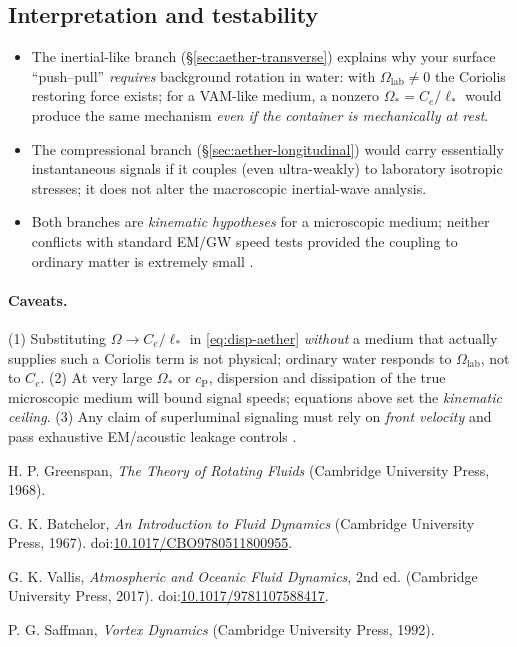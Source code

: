 \documentclass[12pt]{article}
\begin{document}
\subsection{Interpretation and testability}
\begin{itemize}
\item The inertial-like branch (\S\ref{sec:aether-transverse}) explains why your surface ``push--pull'' \emph{requires} background rotation in water: with $\Omega_{\text{lab}}\neq 0$ the Coriolis restoring force exists; for a VAM-like medium, a nonzero $\Omega_*=C_e/\ell_*$ would produce the same mechanism \emph{even if the container is mechanically at rest}.
\item The compressional branch (\S\ref{sec:aether-longitudinal}) would carry essentially instantaneous signals if it couples (even ultra-weakly) to laboratory isotropic stresses; it does not alter the macroscopic inertial-wave analysis.
\item Both branches are \emph{kinematic hypotheses} for a microscopic medium; neither conflicts with standard EM/GW speed tests provided the coupling to ordinary matter is extremely small \cite{Abbott2017PRL,Abbott2017ApJL}.
\end{itemize}

\paragraph{Caveats.}
(1) Substituting $\Omega\to C_e/\ell_*$ in \eqref{eq:disp-aether} \emph{without} a medium that actually supplies such a Coriolis term is not physical; ordinary water responds to $\Omega_{\text{lab}}$, not to $C_e$. (2) At very large $\Omega_*$ or $c_{\mathrm{P}}$, dispersion and dissipation of the true microscopic medium will bound signal speeds; equations above set the \emph{kinematic ceiling}. (3) Any claim of superluminal signaling must rely on \emph{front velocity} and pass exhaustive EM/acoustic leakage controls \cite{Brillouin1960}.



\begin{thebibliography}{9}

H. P. Greenspan, \emph{The Theory of Rotating Fluids} (Cambridge University Press, 1968).

G. K. Batchelor, \emph{An Introduction to Fluid Dynamics} (Cambridge University Press, 1967).
\newblock doi:\href{https://doi.org/10.1017/CBO9780511800955}{10.1017/CBO9780511800955}.

G. K. Vallis, \emph{Atmospheric and Oceanic Fluid Dynamics}, 2nd ed. (Cambridge University Press, 2017).
\newblock doi:\href{https://doi.org/10.1017/9781107588417}{10.1017/9781107588417}.

P. G. Saffman, \emph{Vortex Dynamics} (Cambridge University Press, 1992).

\end{thebibliography}
\end{document}
